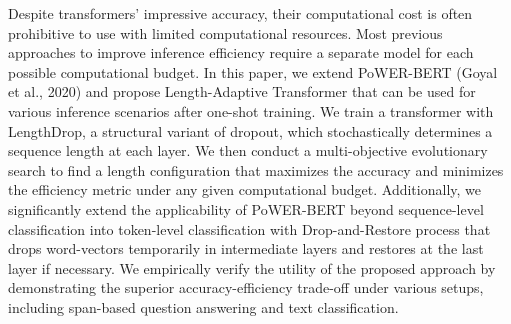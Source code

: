 Despite transformers' impressive accuracy, their computational cost is often prohibitive to use with limited computational resources. Most previous approaches to improve inference efficiency require a separate model for each possible computational budget. In this paper, we extend PoWER-BERT (Goyal et al., 2020) and propose Length-Adaptive Transformer that can be used for various inference scenarios after one-shot training. We train a transformer with LengthDrop, a structural variant of dropout, which stochastically determines a sequence length at each layer. We then conduct a multi-objective evolutionary search to find a length configuration that maximizes the accuracy and minimizes the efficiency metric under any given computational budget. Additionally, we significantly extend the applicability of PoWER-BERT beyond sequence-level classification into token-level classification with Drop-and-Restore process that drops word-vectors temporarily in intermediate layers and restores at the last layer if necessary. We empirically verify the utility of the proposed approach by demonstrating the superior accuracy-efficiency trade-off under various setups, including span-based question answering and text classification.
